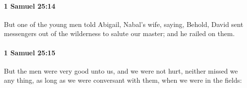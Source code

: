 		\paragraph{1 Samuel 25:14} %
			\label{1SAMUEL-25-14}

			But one of the young men told Abigail, Nabal’s wife, saying, Behold, David sent messengers out of the wilderness to salute our master; and he railed on them.


		\paragraph{1 Samuel 25:15} %
			\label{1SAMUEL-25-15}

			But the men were very good unto us, and we were not hurt, neither missed we any thing, as long as we were conversant with them, when we were in the fields:


